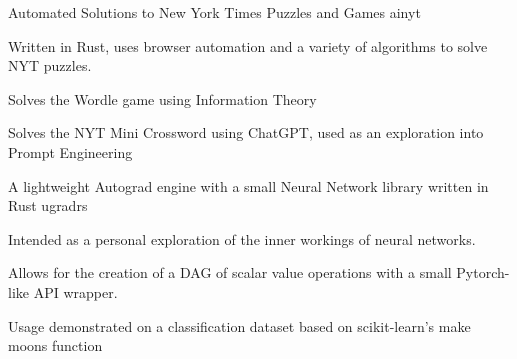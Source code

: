 \begin{cventries}
  \cventry
    {Automated Solutions to New York Times Puzzles and Games}
    {ainyt}
    {}
    {}
    {
      \begin{cvitems}
        \item {Written in Rust, uses browser automation and a variety of algorithms to solve NYT puzzles.}
        \item {Solves the Wordle game using Information Theory}
        \item {Solves the NYT Mini Crossword using ChatGPT, used as an exploration into Prompt Engineering}
      \end{cvitems}
    }
  \cventry
    {A lightweight Autograd engine with a small Neural Network library written in Rust}
    {ugradrs}
    {}
    {}
    {
      \begin{cvitems}
        \item {Intended as a personal exploration of the inner workings of neural networks.}
        \item {Allows for the creation of a DAG of scalar value operations with a small Pytorch-like API wrapper.}
        \item {Usage demonstrated on a classification dataset based on scikit-learn's make moons function}
      \end{cvitems}
    }
\end{cventries}
